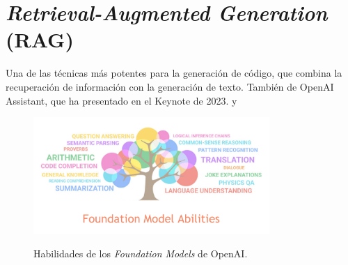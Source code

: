 \section{\textit{Retrieval-Augmented Generation} (RAG)}

Una de las técnicas más potentes para la generación de código, que combina la recuperación de información con la generación de texto. También de OpenAI Assistant, que ha presentado en el Keynote de 2023. \cite{WhatRetrievalaugmentedGeneration2021} y \cite{lewisRetrievalAugmentedGenerationKnowledgeIntensive2021}



    \begin{figure}[H]
        \caption{Habilidades de los \textit{Foundation Models} de OpenAI.}
        \centering
        \includegraphics[width=0.8\textwidth]{./figuras/fundation_models_habilities.png}
        \label{fig:fundation_models_habilities}
    \end{figure}



